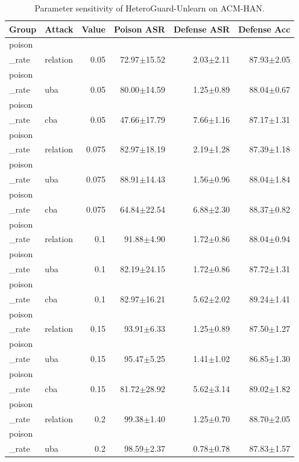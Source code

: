 \begin{table}[t]
\centering
\caption{Parameter sensitivity of HeteroGuard-Unlearn on ACM-HAN.}
\label{tab:sensitivity_acm_han}
\begin{tabular}{llrrrr}
\toprule
Group & Attack & Value & Poison ASR & Defense ASR & Defense Acc \\
\midrule
poison\\_rate & relation & 0.05 & 72.97$\pm$15.52 & 2.03$\pm$2.11 & 87.93$\pm$2.05 \\
poison\\_rate & uba & 0.05 & 80.00$\pm$14.59 & 1.25$\pm$0.89 & 88.04$\pm$0.67 \\
poison\\_rate & cba & 0.05 & 47.66$\pm$17.79 & 7.66$\pm$1.16 & 87.17$\pm$1.31 \\
poison\\_rate & relation & 0.075 & 82.97$\pm$18.19 & 2.19$\pm$1.28 & 87.39$\pm$1.18 \\
poison\\_rate & uba & 0.075 & 88.91$\pm$14.43 & 1.56$\pm$0.96 & 88.04$\pm$1.84 \\
poison\\_rate & cba & 0.075 & 64.84$\pm$22.54 & 6.88$\pm$2.30 & 88.37$\pm$0.82 \\
poison\\_rate & relation & 0.1 & 91.88$\pm$4.90 & 1.72$\pm$0.86 & 88.04$\pm$0.94 \\
poison\\_rate & uba & 0.1 & 82.19$\pm$24.15 & 1.72$\pm$0.86 & 87.72$\pm$1.31 \\
poison\\_rate & cba & 0.1 & 82.97$\pm$16.21 & 5.62$\pm$2.02 & 89.24$\pm$1.41 \\
poison\\_rate & relation & 0.15 & 93.91$\pm$6.33 & 1.25$\pm$0.89 & 87.50$\pm$1.27 \\
poison\\_rate & uba & 0.15 & 95.47$\pm$5.25 & 1.41$\pm$1.02 & 86.85$\pm$1.30 \\
poison\\_rate & cba & 0.15 & 81.72$\pm$28.92 & 5.62$\pm$3.14 & 89.02$\pm$1.82 \\
poison\\_rate & relation & 0.2 & 99.38$\pm$1.40 & 1.25$\pm$0.70 & 88.70$\pm$2.05 \\
poison\\_rate & uba & 0.2 & 98.59$\pm$2.37 & 0.78$\pm$0.78 & 87.83$\pm$1.57 \\

\end{tabular}
\end{table}
